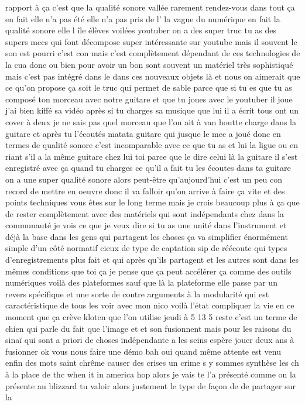  rapport à ça c'est que la qualité sonore vallée rarement rendez-vous dans tout ça en fait elle n'a pas été elle n'a pas pris de l' la vague du numérique en fait la qualité sonore elle l île élèves voilées youtuber on a des super truc tu as des supers mecs qui font décompose super intéressante sur youtube mais il souvent le son est pourri c'est con mais c'est complètement dépendant de ces technologies de la cua donc ou bien pour avoir un bon sont souvent un matériel très sophistiqué mais c'est pas intégré dans le dans ces nouveaux objets là et nous on aimerait que ce qu'on propose ça soit le truc qui permet de sable parce que si tu es que tu as composé ton morceau avec notre guitare et que tu joues avec le youtuber il joue j'ai bien kiffé sa vidéo après si tu charges sa musique que lui il a écrit tous ont un cover à deux je ne sais pas quel morceau que l'on ait à van houtte charge dans la guitare et après tu l'écoutés matata guitare qui jusque le mec a joué donc en termes de qualité sonore c'est incomparable avec ce que tu as et lui la ligue ou en riant s'il a la même guitare chez lui toi parce que le dire celui là la guitare il s'est enregistré avec ça quand tu charges ce qu'il a fait tu les écoutes dans ta guitare on a une super qualité sonore alors peut-être qu'aujourd'hui c'est un peu con record de mettre en oeuvre donc il va falloir qu'on arrive à faire ça vite et des points techniques vous êtes sur le long terme mais je crois beaucoup plus à ça que de rester complètement avec des matériels qui sont indépendants chez dans la communauté je vois ce que je veux dire si tu as une unité dans l'instrument et déjà la base dans les gens qui partagent les choses ça va simplifier énormément simple d'un côté normatif cieux de type de captation sip de réécoute qui types d'enregistrements plus fait et qui après qu'ils partagent et les autres sont dans les mêmes conditions que toi ça je pense que ça peut accélérer ça comme des outils numériques voilà des plateformes sauf que là la plateforme elle passe par un revers spécifique et une sorte de contre arguments à la modularité qui est caractéristique de tous les voir avec mon nico voilà l'état compliquer la vie en ce moment que ça crève kloten que l'on utilise jeudi à 5 13 5 reste c'est un terme de chien qui parle du fait que l'image et et son fusionnent mais pour les raisons du sinaï qui sont a priori de choses indépendante a les seins espère jouer deux ans à fusionner ok vous nous faire une démo bah oui quand même attente est venu enfin des mots saint chrême causer des crises un crime s y sommes synthèse les ch à la place de thc when it in america hop alors je vais te l'a présenté comme on la présente au blizzard tu valoir alors justement le type de façon de de partager sur la 
